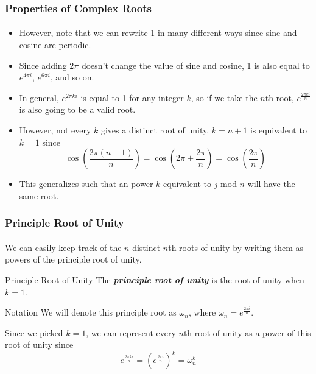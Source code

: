 \documentclass{beamer}                             %
\newcommand{\emphasis}[1]{\textbf{\textit{#1}}}
\begin{document}
\begin{frame}
\frametitle{Properties of Complex Roots}
\framesubtitle{}
\begin{itemize}[<+->]
  \item However, note that we can rewrite 1 in many
    different ways since sine and cosine are periodic.
  \item Since adding \( 2 \pi \) doesn't change the value of sine and cosine,
    1 is also equal to \( e^{4 \pi i} \), \( e^{6 \pi i} \), and so on.
  \item In general, \( e^{2 \pi k i} \) is equal to 1 for
    any integer \( k \), so if we take the \( n \)th root,
    \( e^{\frac{2\pi k i}{n}} \) is also going to be a valid root.
  \item However, not every \( k \) gives a distinct root of unity.
    \( k = n + 1 \) is equivalent to \( k = 1 \) since
    \[ \cos(\frac{2 \pi(n + 1)}{n}) = \cos(2 \pi + \frac{2 \pi}{n})
    = \cos(\frac{2 \pi}{n}) \]
  \item This generalizes such that an power \( k \) equivalent
    to \( j \) mod \( n \) will have the same root.
\end{itemize}
\end{frame}

\begin{frame}
\frametitle{Principle Root of Unity}
\framesubtitle{}
We can easily keep track of the \( n \) distinct \( n \)th roots of unity by 
writing them as powers of the \alert{principle root of unity}.
\begin{alertblock}{Principle Root of Unity}
The \emphasis{principle root of unity} is the root of unity when \( k = 1 \).
\end{alertblock} \pause
\begin{block}{Notation}
We will denote this principle root as \( \omega_n \), where
\( \omega_n = e^{\frac{2 \pi i}{n}} \).
\end{block} \pause
Since we picked \( k = 1 \), we can represent every \( n \)th root of unity as 
a power of this root of unity since 
\[ e^{\frac{2 \pi k i}{n}} = (e^{\frac{2 \pi i}{n}})^k = \omega_n^k \] 
\end{frame}
\end{document}

